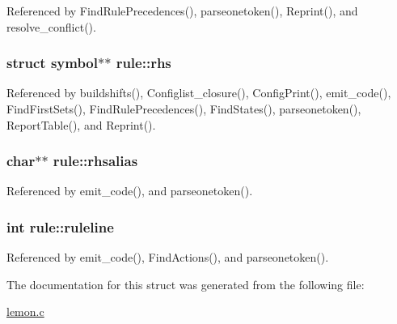 Referenced by Find\-Rule\-Precedences(), parseonetoken(), Reprint(), and resolve\-\_\-conflict().

\hypertarget{structrule_a1f31eea5a96ca6459b6ceef1bdd69817}{
\subsubsection[{rhs}]{\setlength{\rightskip}{0pt plus 5cm}struct {\bf symbol}$\ast$$\ast$ rule\-::rhs}}\label{structrule_a1f31eea5a96ca6459b6ceef1bdd69817}


Referenced by buildshifts(), Configlist\-\_\-closure(), Config\-Print(), emit\-\_\-code(), Find\-First\-Sets(), Find\-Rule\-Precedences(), Find\-States(), parseonetoken(), Report\-Table(), and Reprint().

\hypertarget{structrule_a39d1131dfe7d988244ac3fe866688dc3}{
\subsubsection[{rhsalias}]{\setlength{\rightskip}{0pt plus 5cm}char$\ast$$\ast$ rule\-::rhsalias}}\label{structrule_a39d1131dfe7d988244ac3fe866688dc3}


Referenced by emit\-\_\-code(), and parseonetoken().

\hypertarget{structrule_a158fe6ceafc848655ec981f3f8cc1a7e}{
\subsubsection[{ruleline}]{\setlength{\rightskip}{0pt plus 5cm}int rule\-::ruleline}}\label{structrule_a158fe6ceafc848655ec981f3f8cc1a7e}


Referenced by emit\-\_\-code(), Find\-Actions(), and parseonetoken().



The documentation for this struct was generated from the following file\-:\begin{DoxyCompactItemize}
\item 
\hyperlink{lemon_8c}{lemon.\-c}\end{DoxyCompactItemize}
